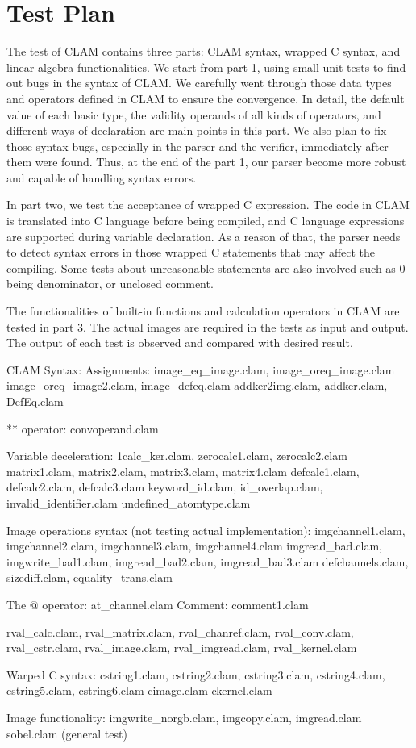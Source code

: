 \chapter{Test Plan}

The test of CLAM contains three parts: CLAM syntax, wrapped C syntax, and linear algebra functionalities. We start from part 1, using small unit tests to find out bugs in the syntax of CLAM. We carefully went through those data types and operators defined in CLAM to ensure the convergence. In detail, the default value of each basic type, the validity operands of all kinds of operators, and different ways of declaration are main points in this part. We also plan to fix those syntax bugs, especially in the parser and the verifier, immediately after them were found. Thus, at the end of the part 1, our  parser become more robust and capable of handling syntax errors.

In part two, we test the acceptance of wrapped C expression. The code in CLAM is translated into C language before being compiled, and C language expressions are supported during variable declaration. As a reason of that,  the parser needs to detect syntax errors in those wrapped C statements that may affect the compiling. Some tests about unreasonable statements are also involved such as 0 being denominator, or unclosed comment.

The functionalities of built-in functions and calculation operators in CLAM are tested in part 3. The actual images are required in the tests as input and output. The output of each test is observed and compared with desired result.

CLAM Syntax:
	Assignments: 
		image_eq_image.clam, image_oreq_image.clam
		image_oreq_image2.clam, image_defeq.clam 
		addker2img.clam, addker.clam, DefEq.clam

	** operator:
		convoperand.clam

	Variable deceleration:
		1calc_ker.clam, zerocalc1.clam, zerocalc2.clam
		matrix1.clam, matrix2.clam, matrix3.clam, matrix4.clam 
		defcalc1.clam, defcalc2.clam, defcalc3.clam
		keyword_id.clam,  id_overlap.clam, invalid_identifier.clam
		undefined_atomtype.clam
		

	Image operations syntax (not testing actual implementation):
		imgchannel1.clam, imgchannel2.clam, imgchannel3.clam, imgchannel4.clam
		imgread_bad.clam, imgwrite_bad1.clam, imgread_bad2.clam, imgread_bad3.clam
		defchannels.clam, sizediff.clam, equality_trans.clam

	The @ operator: at_channel.clam
	Comment: comment1.clam

	rval_calc.clam, rval_matrix.clam, rval_chanref.clam, rval_conv.clam, 
	rval_cstr.clam, rval_image.clam, rval_imgread.clam, rval_kernel.clam


Warped C syntax:
	cstring1.clam, cstring2.clam, cstring3.clam, cstring4.clam, cstring5.clam, cstring6.clam
	cimage.clam
	ckernel.clam

Image functionality:
	imgwrite_norgb.clam,  imgcopy.clam,  imgread.clam
	sobel.clam (general test)
